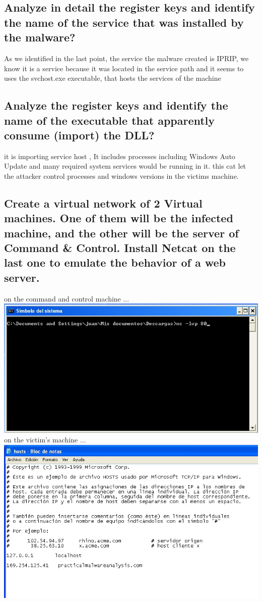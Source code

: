 \documentclass[12pt,letter]{article} %
\begin{document}
        \subsection{Analyze in detail the register keys and identify the name
        of the service that was installed by the malware?}

            As we identified in the last point, the service the
            malware created is IPRIP, we know it is a service because it was
            located in the service path and it seems to uses the svchost.exe
            executable, that hosts the services of the machine

        \subsection{Analyze the register keys and identify the name of the
        executable that apparently consume (import) the DLL?}
            it is importing service host ,  It includes processes including
            Windows Auto Update and many required system services would be
            running in it. this cat let the attacker control processes and
            windows versions in the victims machine.

        \subsection{ Create a virtual network of 2 Virtual machines. One of
        them will be the infected machine, and the other will be the server of
        Command & Control. Install Netcat on the last one to emulate the behavior
        of a web server.}
        on the command and control machine ...
        \\ \includegraphics[width=0.5\linewidth]{ncliste.jpeg}
        \\
        on the victim's machine ...
        \\ \includegraphics[width=0.5\linewidth]{ncvictim.jpeg}
        \\
\end{document}
